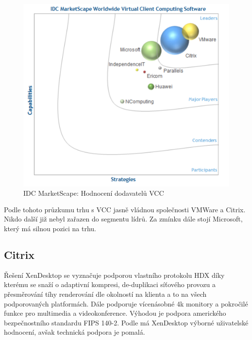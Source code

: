  \begin{figure}[h!]\label{IDC_VM}
\includegraphics[width=13cm]{img/IDC_VM}
\caption{IDC MarketScape: Hodnocení dodavatelů VCC } 
\label{EMM:quadrant}
\centering
\end{figure}

Podle tohoto průzkumu trhu s VCC jasně vládnou společnosti VMWare a Citrix. Nikdo další již nebyl zařazen do segmentu lídrů. Za zmínku dále stojí Microsoft, který má silnou pozici na trhu.



\subsection{Citrix}
Řešení XenDesktop se vyznačuje podporou vlastního protokolu HDX  díky kterému se snaží o adaptivní kompresi, de-duplikaci síťového provozu a přesměrování tíhy renderování dle okolností na klienta a to na všech podporovaných platformách. Dále podporuje vícenásobné 4k monitory a pokročilé funkce pro multimedia a videokonference. Výhodou je podpora amerického bezpečnostního standardu FIPS 140-2.
Podle  má XenDesktop výborné uživatelské hodnocení, avšak technická podpora je pomalá.

